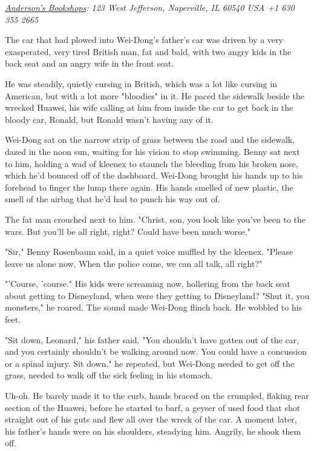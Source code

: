 \emph{\href{http://site.booksite.com/5156/search/?q=for%20the%20win%20doctorow&search=yes&custcat=}{Anderson's Bookshops}: 123 West Jefferson, Naperville, IL 60540 USA +1 630 355 2665}

The car that had plowed into Wei-Dong's father's car was driven by
a very exasperated, very tired British man, fat and bald, with two
angry kids in the back seat and an angry wife in the front seat.

He was steadily, quietly cursing in British, which was a lot like
cursing in American, but with a lot more "bloodies" in it. He paced
the sidewalk beside the wrecked Huawei, his wife calling at him
from inside the car to get back in the bloody car, Ronald, but
Ronald wasn't having any of it.

Wei-Dong sat on the narrow strip of grass between the road and the
sidewalk, dazed in the noon sun, waiting for his vision to stop
swimming. Benny sat next to him, holding a wad of kleenex to
staunch the bleeding from his broken nose, which he'd bounced off
of the dashboard. Wei-Dong brought his hands up to his forehead to
finger the lump there again. His hands smelled of new plastic, the
smell of the airbag that he'd had to punch his way out of.

The fat man crouched next to him. "Christ, son, you look like
you've been to the wars. But you'll be all right, right? Could have
been much worse."

"Sir," Benny Rosenbaum said, in a quiet voice muffled by the
kleenex. "Please leave us alone now. When the police come, we can
all talk, all right?"

"'Course, 'course." His kids were screaming now, hollering from the
back seat about getting to Disneyland, when were they getting to
Disneyland? "Shut it, you monsters," he roared. The sound made
Wei-Dong flinch back. He wobbled to his feet.

"Sit down, Leonard," his father said. "You shouldn't have gotten
out of the car, and you certainly shouldn't be walking around now.
You could have a concussion or a spinal injury. Sit down," he
repeated, but Wei-Dong needed to get off the grass, needed to walk
off the sick feeling in his stomach.

Uh-oh. He barely made it to the curb, hands braced on the crumpled,
flaking rear section of the Huawei, before he started to barf, a
geyser of used food that shot straight out of his guts and flew all
over the wreck of the car. A moment later, his father's hands were
on his shoulders, steadying him. Angrily, he shook them off.

